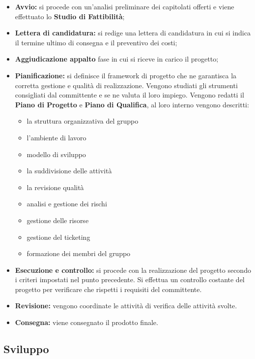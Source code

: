 \begin{itemize}
    \item \textbf{Avvio:} si procede con un'analisi preliminare dei capitolati offerti e viene effettuato lo \textbf{Studio di Fattibilità};
    \item \textbf{Lettera di candidatura:} si redige una lettera di candidatura in cui si indica il termine ultimo di consegna e il preventivo dei costi;
    \item \textbf{Aggiudicazione appalto} fase in cui si riceve in carico il progetto;
    \item \textbf{Pianificazione:} si definisce il framework di progetto che ne garantisca la corretta gestione e qualità di realizzazione. Vengono studiati gli strumenti consigliati dal committente e se ne valuta il loro impiego. Vengono redatti il \textbf{Piano di Progetto} e \textbf{Piano di Qualifica}, al loro interno vengono descritti:
    \begin{itemize}
        \item {la struttura organizzativa del gruppo}
        \item {l'ambiente di lavoro}
        \item {modello di sviluppo}
        \item {la suddivisione delle attività}
        \item {la revisione qualità}
        \item {analisi e gestione dei rischi}
        \item {gestione delle risorse}
        \item {gestione del ticketing}
        \item {formazione dei membri del gruppo}
\end{itemize}
    \item \textbf{Esecuzione e controllo:} si procede con la realizzazione del progetto secondo i criteri impostati nel punto precedente. Si effettua un controllo costante del progetto per verificare che rispetti i requisiti del committente.
    \item \textbf{Revisione:} vengono coordinate le attività di verifica delle attività svolte.
    \item \textbf{Consegna:} viene consegnato il prodotto finale.
\end{itemize}
\subsection{Sviluppo}
